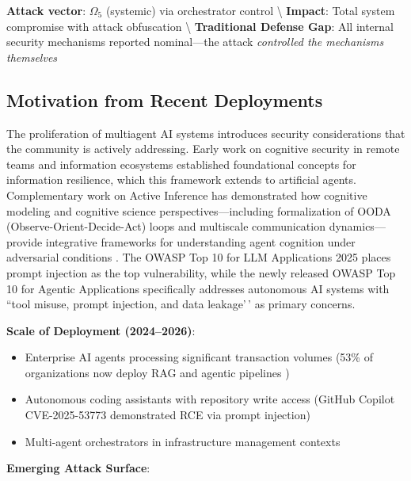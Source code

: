 \documentclass[
]{article}
\begin{document}
\textbf{Attack vector}: \(\Omega_5\) (systemic) via orchestrator control
\textbackslash{} \textbf{Impact}: Total system compromise with attack
obfuscation \textbackslash{} \textbf{Traditional Defense Gap}: All
internal security mechanisms reported nominal---the attack
\textit{controlled the mechanisms themselves}

\subsection{Motivation from Recent Deployments}\label{sec:motivation}

The proliferation of multiagent AI systems introduces security
considerations that the community is actively addressing. Early work on
cognitive security in remote teams and information ecosystems
\citep{cordes2020great, cordes2021narrative, cordes2023atlas}
established foundational concepts for information resilience, which this
framework extends to artificial agents. Complementary work on Active
Inference has demonstrated how cognitive modeling and cognitive science
perspectives---including formalization of OODA
(Observe-Orient-Decide-Act) loops and multiscale communication
dynamics---provide integrative frameworks for understanding agent
cognition under adversarial conditions \cite{david2021aic}. The OWASP
Top 10 for LLM Applications 2025 \cite{owasp2025llm} places prompt
injection as the top vulnerability, while the newly released OWASP Top
10 for Agentic Applications \cite{owasp2025agentic} specifically
addresses autonomous AI systems with ``tool misuse, prompt injection,
and data leakage'\,' as primary concerns.

\textbf{Scale of Deployment (2024--2026)}:

\begin{itemize}
\item Enterprise AI agents processing significant transaction volumes (53\% of organizations now deploy RAG and agentic pipelines \cite{owasp2025llm})
\item Autonomous coding assistants with repository write access (GitHub Copilot CVE-2025-53773 demonstrated RCE via prompt injection)
\item Multi-agent orchestrators in infrastructure management contexts
\end{itemize}

\textbf{Emerging Attack Surface}:
\end{document}
